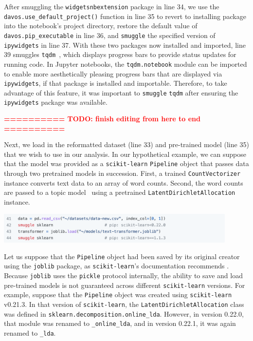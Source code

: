 \documentclass[preprint,12pt,a4paper]{elsarticle}
\newcommand{\stoppedhere}{\bigskip\bigskip\textcolor{red}{\textbf{========== TODO: finish editing from here to end ==========}}\bigskip\bigskip}
\begin{document}
After smuggling the \texttt{widgetsnbextension} package in line 34, we use the \texttt{davos.use\_default\_project()} function in line 35 to revert to installing package into the notebook's project directory, restore the default value of \texttt{davos.pip\_executable} in line 36, and \texttt{smuggle} the specified version of \texttt{ipywidgets} in line 37.
With these two packages now installed
and imported, line 39 smuggles \texttt{tqdm}~\cite{daCoEtal22}, which
displays progress bars to provide status updates for running code. In
Jupyter notebooks, the \texttt{tqdm.notebook} module can be imported
to enable more aesthetically pleasing progress bars that are displayed via
\texttt{ipywidgets}, if that package is installed and
importable. Therefore, to take advantage of this feature, it was
important to \texttt{smuggle} \texttt{tqdm} after ensuring the
\texttt{ipywidgets} package was available.

\stoppedhere

Next, we load in the reformatted dataset (line 33) and pre-trained
model (line 35) that we wish to use in our analysis.  In our
hypothetical example, we can suppose that the model was provided as a
\texttt{scikit-learn} \texttt{Pipeline} object that passes data
through two pretrained models in succession.  First, a trained \texttt{CountVectorizer}
instance converts text data to an array of word counts.  Second, the
word counts are passed to a topic model~\cite{BleiEtal03} using a
pretrained \texttt{LatentDirichletAllocation} instance.
\begin{center}
\includegraphics[width=0.9\textwidth]{figs/example8}
\end{center}
Let us suppose that the \texttt{Pipeline} object had been saved by its
original creator using the \texttt{joblib} package, as
\texttt{scikit-learn}'s documentation recommends \cite{skle22}.  Because
\texttt{joblib} uses the \texttt{pickle} protocol internally, the
ability to save and load pre-trained models is not guaranteed across
different \texttt{scikit-learn} versions.  For example, suppose that
the \texttt{Pipeline} object was created using \texttt{scikit-learn}
v0.21.3.  In that version of \texttt{scikit-learn}, the
\texttt{LatentDirichletAllocation} class was defined in
\texttt{sklearn.decomposition.online\_lda}.  However, in version
0.22.0, that module was renamed to \texttt{\_online\_lda}, and in
version 0.22.1, it was again renamed to \texttt{\_lda}.
\end{document}
